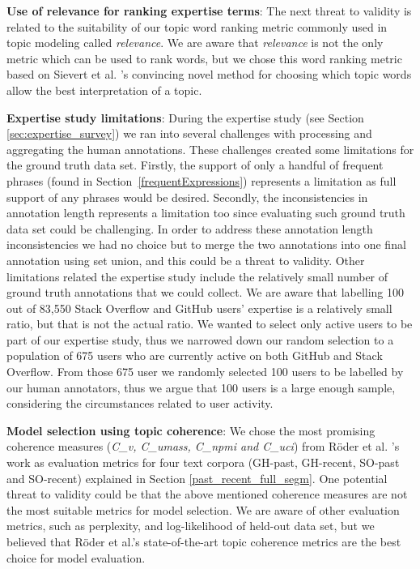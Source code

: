         \textbf{Use of relevance for ranking expertise terms}: The next threat to validity is related to the suitability of our topic word ranking metric commonly used in topic modeling called \emph{relevance}\cite{sievert2014ldavis}. We are aware that \emph{relevance} is not the only metric which can be used to rank words, but we chose this word ranking metric based on Sievert et al. \cite{sievert2014ldavis}'s convincing novel method for choosing which topic words allow the best interpretation of a topic. 
        
        \textbf{Expertise study limitations}: During the expertise study (see Section \ref{sec:expertise_survey}) we ran into several challenges with processing and aggregating the human annotations. These challenges created some limitations for the ground truth data set. Firstly, the support of only a handful of frequent phrases (found in Section~\ref{frequentExpressions}) represents a limitation as full support of any phrases would be desired. Secondly, the inconsistencies in annotation length represents a limitation too since evaluating such ground truth data set could be challenging. In order to address these annotation length inconsistencies we had no choice but to merge the two annotations into one final annotation using set union, and this could be a threat to validity. Other limitations related the expertise study include the relatively small number of ground truth annotations that we could collect. We are aware that labelling 100 out of 83,550 Stack Overflow and GitHub users' expertise is a relatively small ratio, but that is not the actual ratio. We wanted to select only active users to be part of our expertise study, thus we narrowed down our random selection to a population of 675 users who are currently active on both GitHub and Stack Overflow. From those 675 user we randomly selected 100 users to be labelled by our human annotators, thus we argue that 100 users is a large enough sample, considering the circumstances related to user activity.
        
        \textbf{Model selection using topic coherence}: We chose the most promising coherence measures (\emph{C\_v, C\_umass, C\_npmi and C\_uci}) from R{\"o}der et al. \cite{roder2015exploring}'s work as evaluation metrics for four text corpora (GH-past, GH-recent, SO-past and SO-recent) explained in Section \ref{past_recent_full_segm}. One potential threat to validity could be that the above mentioned coherence measures are not the most suitable metrics for model selection. We are aware of other evaluation metrics, such as perplexity, and log-likelihood of held-out data set, but we believed that R{\"o}der et al.'s state-of-the-art topic coherence metrics are the best choice for model evaluation.
        
